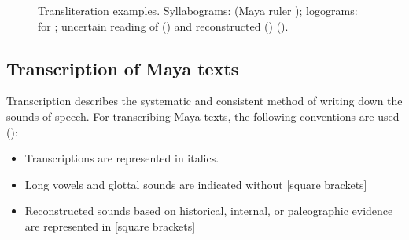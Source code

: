 \documentclass[../main.tex]{subfiles}
\begin{document}
\begin{figure}[ht]
    \centering
    \caption[Transliteration examples]{Transliteration examples.
             Syllabograms: 
            (Maya ruler );
             logograms: 
             for ;
             uncertain reading of 
             () and reconstructed  ()
            (\authordrawings).}
\end{figure}

\subsection{Transcription of Maya texts}
Transcription describes the systematic and consistent method of writing down the sounds of speech.
For transcribing Maya texts, the following conventions are used (\cite[14]{kettunenhelmke2020}):
\begin{itemize}
    \item Transcriptions are represented in italics.
    \item Long vowels and glottal sounds are indicated without [square brackets]
    \item Reconstructed sounds based on historical, internal, or paleographic evidence are 
          represented in [square brackets]
\end{itemize}
\end{document}
